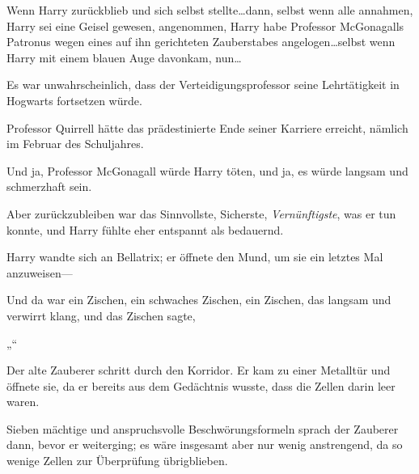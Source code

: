 Wenn Harry zurückblieb und sich selbst stellte…dann, selbst wenn alle annahmen, Harry sei eine Geisel gewesen, angenommen, Harry habe Professor McGonagalls Patronus wegen eines auf ihn gerichteten Zauberstabes angelogen…selbst wenn Harry mit einem blauen Auge davonkam, nun…

Es war unwahrscheinlich, dass der Verteidigungsprofessor seine Lehrtätigkeit in Hogwarts fortsetzen würde.

Professor Quirrell hätte das prädestinierte Ende seiner Karriere erreicht, nämlich im Februar des Schuljahres.

Und ja, Professor McGonagall würde Harry töten, und ja, es würde langsam und schmerzhaft sein.

Aber zurückzubleiben war das Sinnvollste, Sicherste, \emph{Vernünftigste}, was er tun konnte, und Harry fühlte eher entspannt als bedauernd.

Harry wandte sich an Bellatrix; er öffnete den Mund, um sie ein letztes Mal anzuweisen—

Und da war ein Zischen, ein schwaches Zischen, ein Zischen, das langsam und verwirrt klang, und das Zischen sagte,

„“

\later

Der alte Zauberer schritt durch den Korridor. Er kam zu einer Metalltür und öffnete sie, da er bereits aus dem Gedächtnis wusste, dass die Zellen darin leer waren.

Sieben mächtige und anspruchsvolle Beschwörungsformeln sprach der Zauberer dann, bevor er weiterging; es wäre insgesamt aber nur wenig anstrengend, da so wenige Zellen zur Überprüfung übrigblieben.

